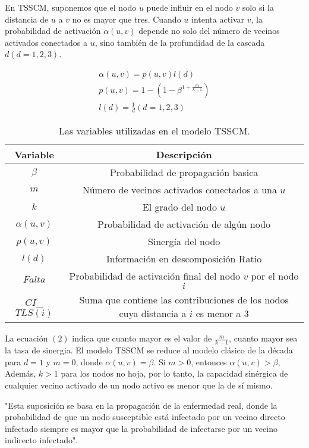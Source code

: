 \documentclass{article}
\begin{document}
En TSSCM, suponemos que el nodo $u$ puede influir en el nodo $v$ solo si la distancia de $u$ a $v$ no es mayor que tres. Cuando $u$ intenta activar $v$, la probabilidad de activación $\alpha(u, v)$ depende no solo del número de vecinos activados conectados a $u$, sino también de la profundidad de la cascada $d(d = 1,2,3)$.

\begin{eqnarray}
		\alpha(u,v) = p(u,v)l(d) \\
		p(u,v) = 1 - (1 - \beta^{ 1 + \frac{m}{k-1} })\\
		l(d) = \frac{1}{d}(d = 1,2,3)
\end{eqnarray}

\begin{table}[h]
	\begin{center}
		\begin{tabular}{| c | c |}
			\hline
			\textbf{Variable} & \textbf{Descripción} \\ 
			\hline
			$\beta$ & Probabilidad de propagación basica \\
		    $m$ & Número de vecinos activados conectados a una $u$\\
		    $k$ & El grado del nodo $u$\\
		    $\alpha(u,v)$ & Probabilidad de activación de algún nodo\\
		    $p(u,v)$ & Sinergía del nodo\\
		    $l(d)$ & Información en descomposición Ratio\\
			$Falta$ & Probabilidad de activación final del nodo $v$ por el nodo $i$ \\
			$CI$\_$TLS(i)$ & Suma que contiene las contribuciones de los nodos cuya distancia a $i$ es menor a 3\\
			\hline
		\end{tabular}
		\caption{Las variables utilizadas en el modelo TSSCM.}
		\label{tab:TablaVariables}
	\end{center}
\end{table}

La ecuación $(2)$ indica que cuanto mayor es el valor de $\frac{m}{k - 1}$, cuanto mayor sea la tasa de sinergia. El modelo TSSCM se reduce al modelo clásico de la década para $d = 1$ y $m = 0$, donde $\alpha(u, v) = \beta$. Si $m > 0$, entonces $\alpha(u, v) > \beta$, Además, $k > 1$ para los nodos no hoja, por lo tanto, la capacidad sinérgica de cualquier vecino activado de un nodo activo es menor que la de sí mismo.

"Esta suposición se basa en la propagación de la enfermedad real, donde la probabilidad de que un nodo susceptible está infectado por un vecino directo infectado siempre es mayor que la probabilidad de infectarse por un vecino indirecto infectado".\cite{cite:36}
\end{document}
